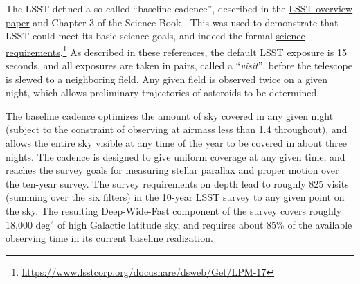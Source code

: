 The LSST defined a so-called ``baseline cadence'', described in the
\href{http://adsabs.harvard.edu/abs/2008arXiv0805.2366I}{LSST overview
paper} \citep{IvezicEtal2008} and Chapter 3 of the Science Book \citep{2009arXiv0912.0201L}.  This was used
to demonstrate that LSST could meet its basic science goals, and indeed
the formal
\href{https://www.lsstcorp.org/docushare/dsweb/Get/LPM-17}{science
requirements}.\footnote{\url{https://www.lsstcorp.org/docushare/dsweb/Get/LPM-17}}    As described in these references, the default LSST
exposure is 15 seconds, and all exposures are taken in pairs, called a
``{\em visit}'', before the telescope is slewed to a neighboring field.
Any given field is observed twice on a given night, which allows
preliminary trajectories of asteroids to be determined.

The baseline cadence optimizes the amount of sky covered in any given
night (subject to the constraint of observing at airmass less than 1.4
throughout), and allows the entire sky visible at any time of the year
to be covered in about three nights.  The cadence is designed to give
uniform coverage at any given time, and reaches the survey goals for
measuring stellar parallax and proper motion over the ten-year survey.
The survey requirements on depth lead to roughly 825 visits (summing
over the six filters) in the 10-year LSST survey to any given point on
the sky.  The resulting Deep-Wide-Fast component of the survey covers
roughly 18,000 deg$^2$ of high Galactic latitude sky, and requires about
85\% of the available observing time in its current baseline realization.

